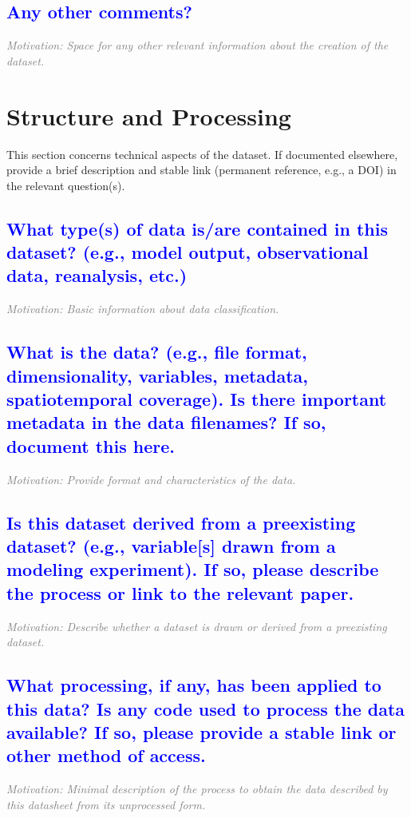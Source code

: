 \documentclass[letterpaper, 10 pt, transmag]{IEEEtran}
\begin{document}
\textcolor{blue}{\subsection{Any other comments?}}
\textcolor{gray}{\textit{Motivation: Space for any other relevant information about the creation of the dataset.}}  

\vspace{10mm}

\section{Structure and Processing}
This section concerns technical aspects of the dataset. If documented elsewhere, provide a brief description and stable link (permanent reference, e.g., a DOI) in the relevant question(s).

\textcolor{blue}{\subsection{What type(s) of data is/are contained in this dataset? (e.g., model output, observational data, reanalysis, etc.)}}
\textcolor{gray}{\textit{Motivation: Basic information about data classification.}}

\textcolor{blue}{\subsection{What is the data? (e.g., file format, dimensionality, variables, metadata, spatiotemporal coverage). Is there important metadata in the data filenames? If so, document this here.}}
\textcolor{gray}{\textit{Motivation: Provide format and characteristics of the data.}}

\textcolor{blue}{\subsection{Is this dataset derived from a preexisting dataset? (e.g., variable[s] drawn from a modeling experiment). If so, please describe the process or link to the relevant paper.}} 
\textcolor{gray}{\textit{Motivation: Describe whether a dataset is drawn or derived from a preexisting dataset.}}

\textcolor{blue}{\subsection{What processing, if any, has been applied to this data? Is any code used to process the data available? If so, please provide a stable link or other method of access.}}
\textcolor{gray}{\textit{Motivation: Minimal description of the process to obtain the data described by this datasheet from its unprocessed form.}}
\end{document}
